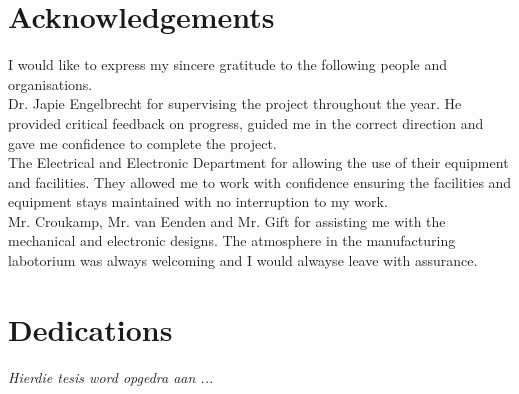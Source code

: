 \begin{abstract}[english]%
meep
\end{abstract}


\begin{abstract}[afrikaans]%
meep
\end{abstract}


\chapter{Acknowledgements}%

I would like to express my sincere gratitude to the following people
and organisations.\\

Dr. Japie Engelbrecht for supervising the project throughout the year. He provided critical feedback on progress, guided me in the correct direction and gave me confidence to complete the project.\\

The Electrical and Electronic Department for allowing the use of their equipment and facilities. They allowed me to work with confidence ensuring the facilities and equipment stays maintained with no interruption to my work.\\

Mr$.$ Croukamp, Mr$.$ van Eenden and Mr$.$ Gift for assisting me with the mechanical and electronic designs. The atmosphere in the manufacturing labotorium was always welcoming and I would alwayse leave with assurance.\\




\chapter{Dedications}%
 \vfill
 \begin{Afr}
 \begin{center}\itshape
    Hierdie tesis word opgedra aan ...
 \end{center}
 \end{Afr}
 \vfill
 \clearpage

\endinput
